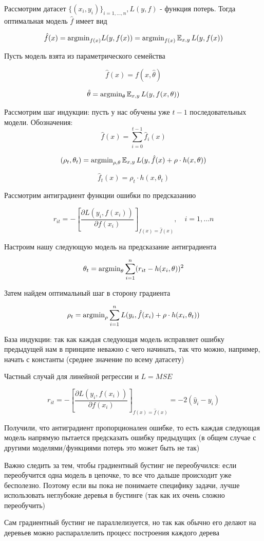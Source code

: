 Рассмотрим датасет $\{(x_i, y_i)\}_{i=1, \ldots, n}, L(y,f)$ - функция потерь. Тогда оптимальная модель $\hat{f}$ имеет вид

\[ \hat{f}(x)=\text{argmin}_{f(x)} L(y, f(x))=\text{argmin}_{f(x)} \operatorname{\mathbb{E}}_{x,y} L(y, f(x))\]

Пусть модель взята из параметрического семейства

\[ \hat{f}(x)=f(x, \hat{\theta})\]

\[ \hat{\theta} = \text{argmin}_\theta \operatorname{\mathbb{E}}_{x,y} L(y, f(x, \theta))\]

Рассмотрим шаг индукции: пусть у нас обучены уже $t-1$ последовательных модели. Обозначения:
\[\hat{f}(x) = \sum_{i=0}^{t-1} \hat{f}_i(x)\]

\[ (\rho_t, \theta_t)=\text{argmin}_{\rho, \theta} \operatorname{\mathbb{E}}_{x,y} L(y, \hat{f}(x)+\rho \cdot h(x, \theta))\]

\[ \hat{f}_t(x)=\rho_t \cdot h(x, \theta_t)\]

Рассмотрим антиградиент функции ошибки по предсказанию

\[ r_{it} = -\left[ \frac{\partial L(y_i, f(x_i))}{\partial f(x_i)}\right]_{f(x)=\hat{f}(x)}, \quad i=1, \ldots n \]

Настроим нашу следующую модель на предсказание антиградиента

\[ \theta_t = \text{argmin}_\theta \sum_{i=1}^n (r_{it} - h(x_i, \theta))^2 \]

Затем найдем оптимальный шаг в сторону градиента

\[ \rho_t = \text{argmin}_\rho \sum_{i=1}^n L(y_i, \hat{f}(x_i)+\rho \cdot h(x_i, \theta_t)) \]

База индукции: так как каждая следующая модель исправляет ошибку предыдущей нам в принципе неважно с чего начинать, так что можно, например, начать с константы (среднее значение по всему датасету)

Частный случай для линейной регрессии и $L=MSE$

\[ r_{it} = -\left[ \frac{\partial L(y_i, f(x_i))}{\partial f(x_i)}\right]_{f(x)=\hat{f}(x)}=-2(\hat{y}_i - y_i) \]

Получили, что антиградиент пропорционален ошибке, то есть каждая следующая модель напрямую пытается предсказать ошибку предыдущих (в общем случае с другими моделями/функциями потерь это может быть не так)

\begin{lemmanote}
    Важно следить за тем, чтобы градиентный бустинг не переобучился: если переобучится одна модель в цепочке, то все что дальше происходит уже бесполезно. Поэтому если вы пока не понимаете специфику задачи, лучше использовать неглубокие деревья в бустинге (так как их очень сложно переобучить)
\end{lemmanote}

\begin{lemmanote}
    Сам градиентный бустинг не параллелизуется, но так как обычно его делают на деревьев можно распараллелить процесс построения каждого дерева
\end{lemmanote}